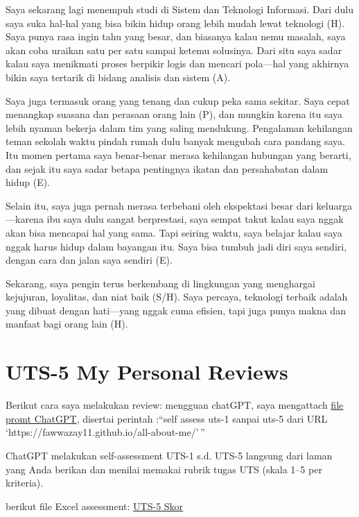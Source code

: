 \documentclass[
  letterpaper,
  DIV=11,
  numbers=noendperiod]{scrreprt}
\begin{document}
Saya sekarang lagi menempuh studi di Sistem dan Teknologi Informasi.
Dari dulu saya suka hal-hal yang bisa bikin hidup orang lebih mudah
lewat teknologi (H). Saya punya rasa ingin tahu yang besar, dan biasanya
kalau nemu masalah, saya akan coba uraikan satu per satu sampai ketemu
solusinya. Dari situ saya sadar kalau saya menikmati proses berpikir
logis dan mencari pola---hal yang akhirnya bikin saya tertarik di bidang
analisis dan sistem (A).

Saya juga termasuk orang yang tenang dan cukup peka sama sekitar. Saya
cepat menangkap suasana dan perasaan orang lain (P), dan mungkin karena
itu saya lebih nyaman bekerja dalam tim yang saling mendukung.
Pengalaman kehilangan teman sekolah waktu pindah rumah dulu banyak
mengubah cara pandang saya. Itu momen pertama saya benar-benar merasa
kehilangan hubungan yang berarti, dan sejak itu saya sadar betapa
pentingnya ikatan dan persahabatan dalam hidup (E).

Selain itu, saya juga pernah merasa terbebani oleh ekspektasi besar dari
keluarga---karena ibu saya dulu sangat berprestasi, saya sempat takut
kalau saya nggak akan bisa mencapai hal yang sama. Tapi seiring waktu,
saya belajar kalau saya nggak harus hidup dalam bayangan itu. Saya bisa
tumbuh jadi diri saya sendiri, dengan cara dan jalan saya sendiri (E).

Sekarang, saya pengin terus berkembang di lingkungan yang menghargai
kejujuran, loyalitas, dan niat baik (S/H). Saya percaya, teknologi
terbaik adalah yang dibuat dengan hati---yang nggak cuma efisien, tapi
juga punya makna dan manfaat bagi orang lain (H).


\chapter{UTS-5 My Personal Reviews}\label{uts-5-my-personal-reviews}

Berikut cara saya melakukan review: mengguan chatGPT, saya mengattach
\href{skor_uts.pdf}{file promt ChatGPT}, disertai perintah :``self
assess uts-1 sanpai uts-5 dari URL
`https://fawwazay11.github.io/all-about-me/'\,''

ChatGPT melakukan self-assessment UTS-1 s.d. UTS-5 langsung dari laman
yang Anda berikan dan menilai memakai rubrik tugas UTS (skala 1--5 per
kriteria).

berikut file Excel assessment: \href{UTS-5_Skor.xlsx}{UTS-5 Skor}

\end{document}
